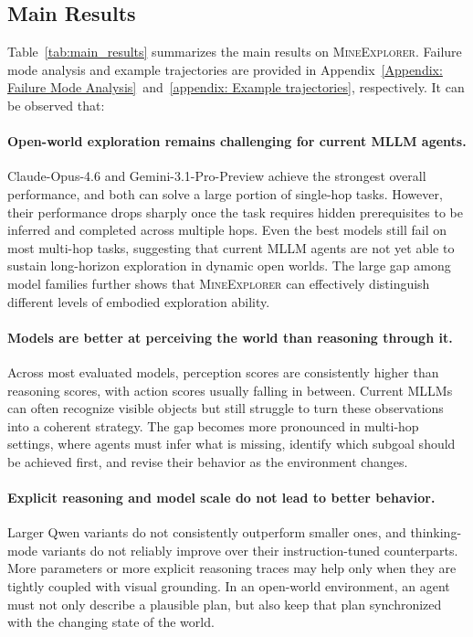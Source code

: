 \documentclass[11pt]{article}
\begin{document}
\subsection{Main Results}

Table~\ref{tab:main_results} summarizes the main results on \textsc{MineExplorer}. 
Failure mode analysis and example trajectories are provided in Appendix~\ref{Appendix: Failure Mode Analysis}~and~\ref{appendix: Example trajectories}, respectively. 
It can be observed that:

\paragraph{Open-world exploration remains challenging for current MLLM agents.} 
Claude-Opus-4.6 and Gemini-3.1-Pro-Preview achieve the strongest overall performance, and both can solve a large portion of single-hop tasks. 
However, their performance drops sharply once the task requires hidden prerequisites to be inferred and completed across multiple hops. 
Even the best models still fail on most multi-hop tasks, suggesting that current MLLM agents are not yet able to sustain long-horizon exploration in dynamic open worlds. 
The large gap among model families further shows that \textsc{MineExplorer} can effectively distinguish different levels of embodied exploration ability.

\paragraph{Models are better at perceiving the world than reasoning through it.} 
Across most evaluated models, perception scores are consistently higher than reasoning scores, with action scores usually falling in between. 
Current MLLMs can often recognize visible objects but still struggle to turn these observations into a coherent strategy. 
The gap becomes more pronounced in multi-hop settings, where agents must infer what is missing, identify which subgoal should be achieved first, and revise their behavior as the environment changes. 

\paragraph{Explicit reasoning and model scale do not lead to better behavior.} 
Larger Qwen variants do not consistently outperform smaller ones, and thinking-mode variants do not reliably improve over their instruction-tuned counterparts. 
More parameters or more explicit reasoning traces may help only when they are tightly coupled with visual grounding. 
In an open-world environment, an agent must not only describe a plausible plan, but also keep that plan synchronized with the changing state of the world.
\end{document}
